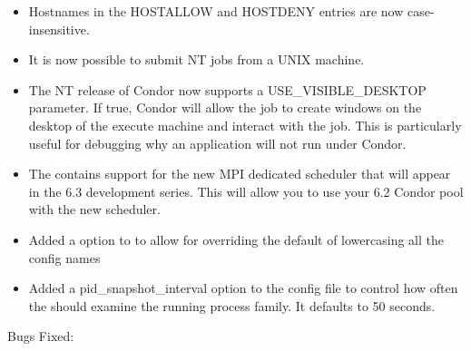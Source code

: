 \begin{itemize}

\item Hostnames in the HOSTALLOW and HOSTDENY entries are now case-insensitive.

\item It is now possible to submit NT jobs from a UNIX machine.

\item The NT release of Condor now supports a USE\_VISIBLE\_DESKTOP parameter. 
If true, Condor will allow the job to create windows on the desktop of the
execute machine and interact with the job. This is particularly useful for 
debugging why an application will not run under Condor.

\item The  contains support for the new MPI dedicated 
scheduler that will appear in the 6.3 development series. This will allow
you to use your 6.2 Condor pool with the new scheduler.

\item Added a  option to  to allow 
for overriding the default of lowercasing all the config names

\item Added a pid\_snapshot\_interval option to the config file to
control how often the  should examine the running 
process family. It defaults to 50 seconds.

\end{itemize}

\noindent Bugs Fixed:

